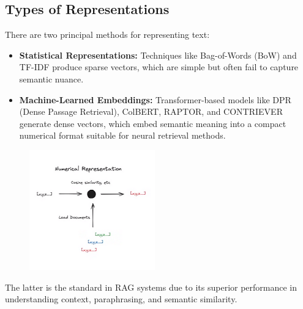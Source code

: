 \documentclass[twocolumn, 10pt]{article}
\begin{document}
\subsection{Types of Representations}

There are two principal methods for representing text:

\begin{itemize}
    \item \textbf{Statistical Representations:} Techniques like Bag-of-Words (BoW) and TF-IDF produce sparse vectors, which are simple but often fail to capture semantic nuance.
    \item \textbf{Machine-Learned Embeddings:} Transformer-based models like DPR (Dense Passage Retrieval), ColBERT, RAPTOR, and CONTRIEVER generate dense vectors, which embed semantic meaning into a compact numerical format suitable for neural retrieval methods.
\end{itemize}

\begin{figure}[H]
    \centering
   \includegraphics[width=0.85\linewidth]{thirdimage.jpg}
    \caption{}
    \label{fig:indexing-process}
\end{figure}



The latter is the standard in RAG systems due to its superior performance in understanding context, paraphrasing, and semantic similarity.
\end{document}
